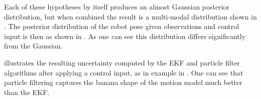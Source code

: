 Each of these hypotheses by itself produces an almost Gaussian
posterior distribution, but when combined the result is a multi-modal
distribution shown in . The posterior
distribution of the robot pose given observations and control input is
then as shown in . As one can see this
distribution differs significantly from the Gaussian.



 illustrates the resulting uncertainty
computed by the EKF and particle filter algorithms after applying a
control input, as in example in . One can see
that particle filtering captures the banana shape of the motion model
much better than the EKF.


